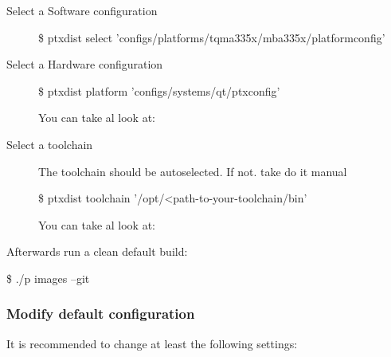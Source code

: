 \begin{description}
    \item[Select a Software configuration]
        \begin{listing}[language=bash]
            \$  ptxdist select 'configs/platforms/tqma335x/mba335x/platformconfig'
        \end{listing}
        \newline
        \cite[Selecting a Userland Configuration]{PTXdist:User_Manual}
    \item[Select a Hardware configuration]
        \begin{listing}[language=bash]
            \$ ptxdist platform 'configs/systems/qt/ptxconfig'
        \end{listing}
        You can take al look at:
        \cite[Selecting a Hardware Platform]{PTXdist:User_Manual}
    \item[Select a toolchain]
        The toolchain should be autoselected. If not. take do it manual
        \begin{listing}[language=bash]
            \$ ptxdist toolchain '/opt/<path-to-your-toolchain/bin'
        \end{listing}
        You can take al look at:
        \cite[Selecting a Toolchain]{PTXdist:User_Manual}
\end{description}

Afterwards run a clean default build:
        \begin{listing}[language=bash]
            \$ ./p images --git
        \end{listing}


\subsubsection{Modify default configuration}%
\label{ssub:Modify default configuration}

It is recommended to change at least the following settings:

